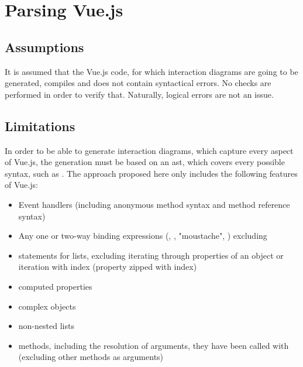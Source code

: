 \section{Parsing Vue.js}

\subsection{Assumptions}
It is assumed that the Vue.js code, for which interaction diagrams are going to be generated, compiles and does not contain syntactical errors. No checks are performed in order to verify that. Naturally, logical errors are not an issue.
\subsection{Limitations}
\label{concept:parsing_limits}

In order to be able to generate interaction diagrams, which capture every aspect of Vue.js, the generation must be based on an \gls{ast}, which covers every possible syntax, such as \cite{eslint_vue_parser_ast}. The approach proposed here only includes the following features of Vue.js:
\begin{itemize}
    \item Event handlers (including anonymous method syntax and method reference syntax)
    \item Any one or two-way binding expressions (, , "moustache", ) excluding 
    \item {} statements for lists, excluding iterating through properties of an object or iteration with index (property zipped with index)
    \item computed properties
    \item complex objects
    \item non-nested lists 
    \item methods, including the resolution of arguments, they have been called with (excluding other methods as arguments)
\end{itemize}

